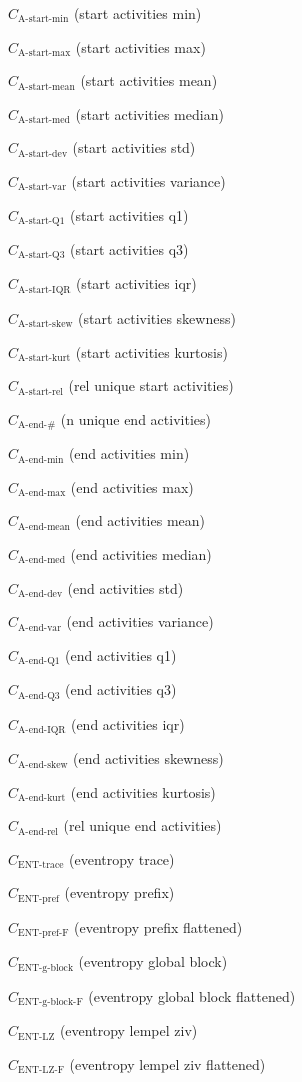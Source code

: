 \documentclass[a4paper]{article}
\newcommand{\startactivitiesrelname}{\text{A-start-rel}}
\newcommand{\startactivitiesrel}{C_{\startactivitiesrelname}}
\newcommand{\startminname}{\text{A-start-min}}
\newcommand{\startmin}{C_{\startminname}}
\newcommand{\startmaxname}{\text{A-start-max}}
\newcommand{\startmax}{C_{\startmaxname}}
\newcommand{\startmeanname}{\text{A-start-mean}}
\newcommand{\startmean}{C_{\startmeanname}}
\newcommand{\startmedianname}{\text{A-start-med}}
\newcommand{\startmedian}{C_{\startmedianname}}
\newcommand{\startdevname}{\text{A-start-dev}}
\newcommand{\startdev}{C_{\startdevname}}
\newcommand{\startvarname}{\text{A-start-var}}
\newcommand{\startvar}{C_{\startvarname}}
\newcommand{\startqonename}{\text{A-start-Q1}}
\newcommand{\startqone}{C_{\startqonename}}
\newcommand{\startqthreename}{\text{A-start-Q3}}
\newcommand{\startqthree}{C_{\startqthreename}}
\newcommand{\startiqrname}{\text{A-start-IQR}}
\newcommand{\startiqr}{C_{\startiqrname}}
\newcommand{\startskewname}{\text{A-start-skew}}
\newcommand{\startskew}{C_{\startskewname}}
\newcommand{\startkurtname}{\text{A-start-kurt}}
\newcommand{\startkurt}{C_{\startkurtname}}
\newcommand{\lastactivitiesname}{\text{A-end-\#}}
\newcommand{\lastactivities}{C_{\lastactivitiesname}}
\newcommand{\lastactivitiesrelname}{\text{A-end-rel}}
\newcommand{\lastactivitiesrel}{C_{\lastactivitiesrelname}}
\newcommand{\lastminname}{\text{A-end-min}}
\newcommand{\lastmin}{C_{\lastminname}}
\newcommand{\lastmaxname}{\text{A-end-max}}
\newcommand{\lastmax}{C_{\lastmaxname}}
\newcommand{\lastmeanname}{\text{A-end-mean}}
\newcommand{\lastmean}{C_{\lastmeanname}}
\newcommand{\lastmedianname}{\text{A-end-med}}
\newcommand{\lastmedian}{C_{\lastmedianname}}
\newcommand{\lastdevname}{\text{A-end-dev}}
\newcommand{\lastdev}{C_{\lastdevname}}
\newcommand{\lastvarname}{\text{A-end-var}}
\newcommand{\lastvar}{C_{\lastvarname}}
\newcommand{\lastqonename}{\text{A-end-Q1}}
\newcommand{\lastqone}{C_{\lastqonename}}
\newcommand{\lastqthreename}{\text{A-end-Q3}}
\newcommand{\lastqthree}{C_{\lastqthreename}}
\newcommand{\lastiqrname}{\text{A-end-IQR}}
\newcommand{\lastiqr}{C_{\lastiqrname}}
\newcommand{\lastskewname}{\text{A-end-skew}}
\newcommand{\lastskew}{C_{\lastskewname}}
\newcommand{\lastkurtname}{\text{A-end-kurt}}
\newcommand{\lastkurt}{C_{\lastkurtname}}
\newcommand{\enttracename}{\text{ENT-trace}}
\newcommand{\enttrace}{C_{\enttracename}}
\newcommand{\entprefixname}{\text{ENT-pref}}
\newcommand{\entprefix}{C_{\entprefixname}}
\newcommand{\entprefixflatname}{\text{ENT-pref-F}}
\newcommand{\entprefixflat}{C_{\entprefixflatname}}
\newcommand{\entgblockname}{\text{ENT-g-block}}
\newcommand{\entgblock}{C_{\entgblockname}}
\newcommand{\entgblockflatname}{\text{ENT-g-block-F}}
\newcommand{\entgblockflat}{C_{\entgblockflatname}}
\newcommand{\entlempelzivname}{\text{ENT-LZ}}
\newcommand{\entlempelziv}{C_{\entlempelzivname}}
\newcommand{\entlempelzivflatname}{\text{ENT-LZ-F}}
\newcommand{\entlempelzivflat}{C_{\entlempelzivflatname}}
\begin{document}
\begin{compactenum}
\item $\startmin$ (start activities min)
\item $\startmax$ (start activities max)
\item $\startmean$ (start activities mean)
\item $\startmedian$ (start activities median)
\item $\startdev$ (start activities std)
\item $\startvar$ (start activities variance)
\item $\startqone$ (start activities q1)
\item $\startqthree$ (start activities q3)
\item $\startiqr$ (start activities iqr)
\item $\startskew$ (start activities skewness)
\item $\startkurt$ (start activities kurtosis)
\item $\startactivitiesrel$ (rel unique start activities)
\item $\lastactivities$ (n unique end activities)
\item $\lastmin$ (end activities min)
\item $\lastmax$ (end activities max)
\item $\lastmean$ (end activities mean)
\item $\lastmedian$ (end activities median)
\item $\lastdev$ (end activities std)
\item $\lastvar$ (end activities variance)
\item $\lastqone$ (end activities q1)
\item $\lastqthree$ (end activities q3)
\item $\lastiqr$ (end activities iqr)
\item $\lastskew$ (end activities skewness)
\item $\lastkurt$ (end activities kurtosis)
\item $\lastactivitiesrel$ (rel unique end activities)
\item $\enttrace$ (eventropy trace)
\item $\entprefix$ (eventropy prefix)
\item $\entprefixflat$ (eventropy prefix flattened)
\item $\entgblock$ (eventropy global block)
\item $\entgblockflat$ (eventropy global block flattened)
\item $\entlempelziv$ (eventropy lempel ziv)
\item $\entlempelzivflat$ (eventropy lempel ziv flattened)

\end{compactenum}
\end{document}
